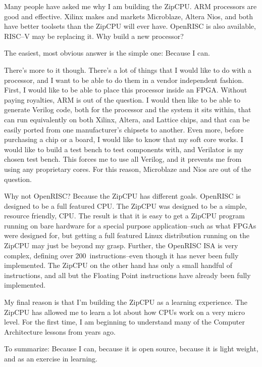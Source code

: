 \documentclass{gqtekspec}
\begin{document}
\tableofcontents
\listoffigures
\listoftables
\begin{preface}
Many people have asked me why I am building the ZipCPU. ARM processors are
good and effective.  Xilinx makes and markets Microblaze, Altera Nios, and both
have better toolsets than the ZipCPU will ever have. OpenRISC is also
available, RISC--V may be replacing it. Why build a new processor?

The easiest, most obvious answer is the simple one: Because I can.

There's more to it though. There's a lot of things that I would like to do with
a processor, and I want to be able to do them in a vendor independent fashion.
First, I would like to be able to place this processor inside an FPGA.  Without
paying royalties, ARM is out of the question.  I would then like to be able to
generate Verilog code, both for the processor and the system it sits within,
that can run equivalently on both Xilinx, Altera, and Lattice chips, and that
can be easily ported from one manufacturer's chipsets to another. Even more,
before purchasing a chip or a board, I would like to know that my soft core
works. I would like to build a test bench to test components with, and
Verilator is my chosen test bench. This forces me to use all Verilog, and it
prevents me from using any proprietary cores. For this reason, Microblaze and
Nios are out of the question.

Why not OpenRISC? Because the ZipCPU has different goals.  OpenRISC is designed
to be a full featured CPU.  The ZipCPU was designed to be a simple, resource
friendly, CPU.  The result is that it is easy to get a ZipCPU program running
on bare hardware for a special purpose application--such as what FPGAs were
designed for, but getting a full featured
Linux distribution running on the ZipCPU may just be beyond my grasp.  Further,
the OpenRISC ISA is very complex, defining over 200~instructions--even though
it has never been fully implemented.  The ZipCPU on the other hand has only
a small handful of instructions, and all but the Floating Point instructions
have already been fully implemented.

My final reason is that I'm building the ZipCPU as a learning experience. The
ZipCPU has allowed me to learn a lot about how CPUs work on a very micro
level. For the first time, I am beginning to understand many of the Computer
Architecture lessons from years ago.

To summarize: Because I can, because it is open source, because it is light
weight, and as an exercise in learning. 

\end{preface}
\end{document}
